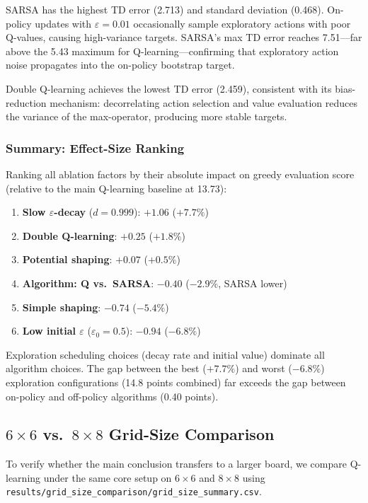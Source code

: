 \documentclass[10pt,conference]{IEEEtran}
\begin{document}
SARSA has the highest TD error (2.713) and standard deviation (0.468).
On-policy updates with $\varepsilon=0.01$ occasionally sample
exploratory actions with poor Q-values, causing high-variance
targets.
SARSA's max TD error reaches 7.51---far above the 5.43 maximum
for Q-learning---confirming that exploratory action noise propagates
into the on-policy bootstrap target.

Double Q-learning achieves the lowest TD error (2.459),
consistent with its bias-reduction mechanism:
decorrelating action selection and value evaluation reduces
the variance of the max-operator, producing more stable targets.

\subsubsection{Summary: Effect-Size Ranking}

Ranking all ablation factors by their absolute impact on greedy
evaluation score (relative to the main Q-learning baseline at 13.73):

\begin{enumerate}
  \item \textbf{Slow $\varepsilon$-decay} ($d=0.999$): $+1.06$ ($+7.7\%$)
  \item \textbf{Double Q-learning}: $+0.25$ ($+1.8\%$)
  \item \textbf{Potential shaping}: $+0.07$ ($+0.5\%$)
  \item \textbf{Algorithm: Q vs.\ SARSA}: $-0.40$ ($-2.9\%$, SARSA lower)
  \item \textbf{Simple shaping}: $-0.74$ ($-5.4\%$)
  \item \textbf{Low initial $\varepsilon$} ($\varepsilon_0=0.5$): $-0.94$ ($-6.8\%$)
\end{enumerate}

Exploration scheduling choices (decay rate and initial value)
dominate all algorithm choices.
The gap between the best ($+7.7\%$) and worst ($-6.8\%$) exploration
configurations (14.8 points combined) far exceeds the gap between
on-policy and off-policy algorithms (0.40 points).

\subsection{$6{\times}6$ vs.\ $8{\times}8$ Grid-Size Comparison}

To verify whether the main conclusion transfers to a larger board, we
compare Q-learning under the same core setup on $6{\times}6$ and $8{\times}8$
using \texttt{results/grid\_size\_comparison/grid\_size\_summary.csv}.
\end{document}
